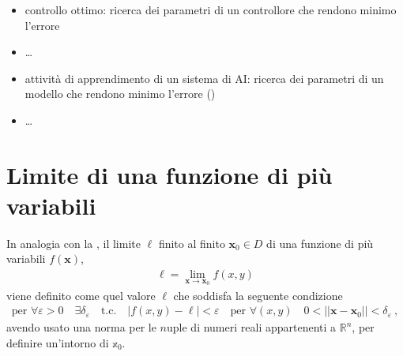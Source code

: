\documentclass[letterpaper,10pt,italian]{jupyterBook}
\begin{document}
\begin{itemize}
\begin{itemize}
\item {} 
\sphinxAtStartPar
controllo ottimo: ricerca dei parametri di un controllore che rendono minimo l’errore

\item {} 
\sphinxAtStartPar
…

\item {} 
\sphinxAtStartPar
attività di apprendimento di un sistema di AI: ricerca dei parametri di un modello che rendono minimo l’errore ()

\item {} 
\sphinxAtStartPar
…

\end{itemize}

\end{itemize}



\sphinxstepscope


\section{Limite di una funzione di più variabili}
\label{\detokenize{ch/multivariable-calculus/limits:limite-di-una-funzione-di-piu-variabili}}\label{\detokenize{ch/multivariable-calculus/limits:multivariable-calculus-limit}}\label{\detokenize{ch/multivariable-calculus/limits::doc}}
\sphinxAtStartPar
In analogia con la {\hyperref[\detokenize{ch/infinitesimal_calculus/analysis:infinitesimal-calculus-limits-def}]{}}, il limite \(\ell\) finito al finito \(\mathbf{x}_0 \in D\) di una funzione di più variabili \(f(\mathbf{x})\),
\begin{equation*}
\begin{split}\ell = \lim_{\mathbf{x} \rightarrow \mathbf{x}_0} f(x,y)\end{split}
\end{equation*}
\sphinxAtStartPar
viene definito come quel valore \(\ell\) che soddisfa la seguente condizione
\begin{equation*}
\begin{split}\text{per } \forall \varepsilon > 0 \quad \exists \delta_{\varepsilon} \quad \text{t.c.} \quad |f(x,y) - \ell| < \varepsilon \quad \text{per } \forall (x,y) \quad 0 < || \mathbf{x} - \mathbf{x}_0|| < \delta_\varepsilon \ ,\end{split}
\end{equation*}
\sphinxAtStartPar
avendo usato una norma per le \(n\)\sphinxhyphen{}uple di numeri reali appartenenti a \(\mathbb{R}^n\), per definire un’intorno di \(\mathbb{x}_0\).
\end{document}
